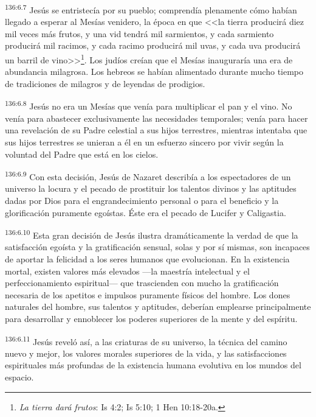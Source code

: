 \par 
\textsuperscript{136:6.7} Jesús se entristecía por su pueblo; comprendía plenamente cómo habían llegado a esperar al Mesías venidero, la época en que <<la tierra producirá diez mil veces más frutos, y una vid tendrá mil sarmientos, y cada sarmiento producirá mil racimos, y cada racimo producirá mil uvas, y cada uva producirá un barril de vino>>\footnote{\textit{La tierra dará frutos}: Is 4:2; Is 5:10; 1 Hen 10:18-20a.}. Los judíos creían que el Mesías inauguraría una era de abundancia milagrosa. Los hebreos se habían alimentado durante mucho tiempo de tradiciones de milagros y de leyendas de prodigios.

\par 
\textsuperscript{136:6.8} Jesús no era un Mesías que venía para multiplicar el pan y el vino. No venía para abastecer exclusivamente las necesidades temporales; venía para hacer una revelación de su Padre celestial a sus hijos terrestres, mientras intentaba que sus hijos terrestres se unieran a él en un esfuerzo sincero por vivir según la voluntad del Padre que está en los cielos.

\par 
\textsuperscript{136:6.9} Con esta decisión, Jesús de Nazaret describía a los espectadores de un universo la locura y el pecado de prostituir los talentos divinos y las aptitudes dadas por Dios para el engrandecimiento personal o para el beneficio y la glorificación puramente egoístas. Éste era el pecado de Lucifer y Caligastia.

\par 
\textsuperscript{136:6.10} Esta gran decisión de Jesús ilustra dramáticamente la verdad de que la satisfacción egoísta y la gratificación sensual, solas y por sí mismas, son incapaces de aportar la felicidad a los seres humanos que evolucionan. En la existencia mortal, existen valores más elevados ---la maestría intelectual y el perfeccionamiento espiritual--- que trascienden con mucho la gratificación necesaria de los apetitos e impulsos puramente físicos del hombre. Los dones naturales del hombre, sus talentos y aptitudes, deberían emplearse principalmente para desarrollar y ennoblecer los poderes superiores de la mente y del espíritu.

\par 
\textsuperscript{136:6.11} Jesús reveló así, a las criaturas de su universo, la técnica del camino nuevo y mejor, los valores morales superiores de la vida, y las satisfacciones espirituales más profundas de la existencia humana evolutiva en los mundos del espacio.

